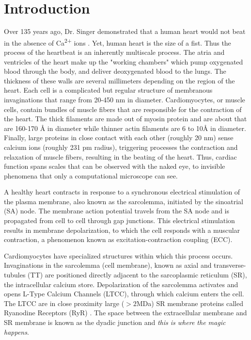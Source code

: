 \documentclass[12pt]{ucsddissertation}
\begin{document}
\section{Introduction}
 Over 135 years ago, Dr. Singer demonstrated that a human heart would not beat in the absence of Ca\textsuperscript{2+} ions \cite{Ringer1883}. Yet, human heart is the size of a fist. Thus the process of the heartbeat is an inherently multiscale process. The atria and ventricles of the heart make up the "working chambers" which pump oxygenated blood through the body, and deliver deoxygenated blood to the lungs. The thickness of these walls are several millimeters depending on the region of the heart. Each cell is a complicated but regular structure of membranous invaginations that range from 20-450 nm in diameter. Cardiomyocytes, or muscle cells, contain bundles of muscle fibers that are responsible for the contraction of the heart. The thick filaments are made out of myosin protein and are about that are 160-170 \si{\angstrom} in diameter while thinner actin filaments are 6 to 10\si{\angstrom} in diameter. Finally, large proteins in close contact with each other (roughly 20 nm) sense calcium ions (roughly 231 pm radius), triggering processes the contraction and relaxation of muscle fibers, resulting in the beating of the heart. Thus, cardiac function spans scales that can be observed with the naked eye, to invisible phenomena that only a computational microscope can see.  

 A healthy heart contracts in response to a synchronous electrical stimulation of the plasma membrane, also known as the sarcolemma, initiated by the sinoatrial (SA) node. The membrane action potential travels from the SA node and is propagated from cell to cell through gap junctions\cite{Bernstein2006}. This electrical stimulation results in membrane depolarization, to which the cell responds with a muscular contraction, a phenomenon known as  excitation-contraction coupling (ECC)\cite{Cheng1994}. 
 
 Cardiomyocytes have specialized structures within which this process occurs. Invaginations in the sarcolemma (cell membrane), known as axial and transverse-tubules (TT) are positioned directly adjacent to the sarcoplasmic reticulum (SR), the intracellular calcium store. Depolarization of the sarcolemma activates and opens L-Type Calcium Channels (LTCC), through which calcium enters the cell. The LTCC are in close proximity large ($>2$MDa) SR membrane proteins called Ryanodine Receptors (RyR) \cite{Lanner2010}. The space between the extracellular membrane and SR membrane is known as the dyadic junction and \textit{this is where the magic happens}.
\end{document}
